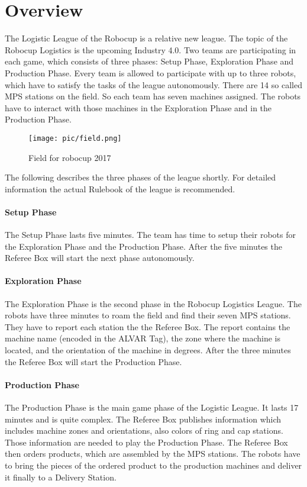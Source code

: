 \section{Overview}

The Logistic League of the Robocup is a relative new league. The topic of the Robocup Logistics is the upcoming Industry 4.0. Two teams are participating in each game, which consists of three phases: Setup Phase, Exploration Phase and Production Phase. Every team is allowed to participate with up to three robots, which have to satisfy the tasks of the league autonomously. There are 14 so called MPS stations on the field. So each team has seven machines assigned. The robots have to interact with those machines in the Exploration Phase and in the Production Phase.

\begin{figure}%
\centering
\texttt{[image: pic/field.png]}
\caption{Field for robocup 2017}
\label{fig:frog}
\end{figure}

The following describes the three phases of the league shortly. For detailed information the actual Rulebook  \cite{RC17} of the league is recommended.

\paragraph{Setup Phase}
The Setup Phase lasts five minutes. The team has time to setup their robots for the Exploration Phase and the Production Phase. After the five minutes the Referee Box will start the next phase autonomously.

\paragraph{Exploration Phase}
The Exploration Phase is the second phase in the Robocup Logistics League. The robots have three minutes to roam the field and find their seven MPS stations. They have to report each station the the Referee Box. The report contains the machine name (encoded in the ALVAR Tag), the zone where the machine is located, and the orientation of the machine in degrees. After the three minutes the Referee Box will start the Production Phase.

\paragraph{Production Phase}
The Production Phase is the main game phase of the Logistic League. It lasts 17 minutes and is quite complex. The Referee Box publishes information which includes machine zones and orientations, also colors of ring and cap stations. Those information are needed to play the Production Phase. The Referee Box then orders products, which are assembled by the MPS stations. The robots have to bring the pieces of the ordered product to the production machines and deliver it finally to a Delivery Station.


